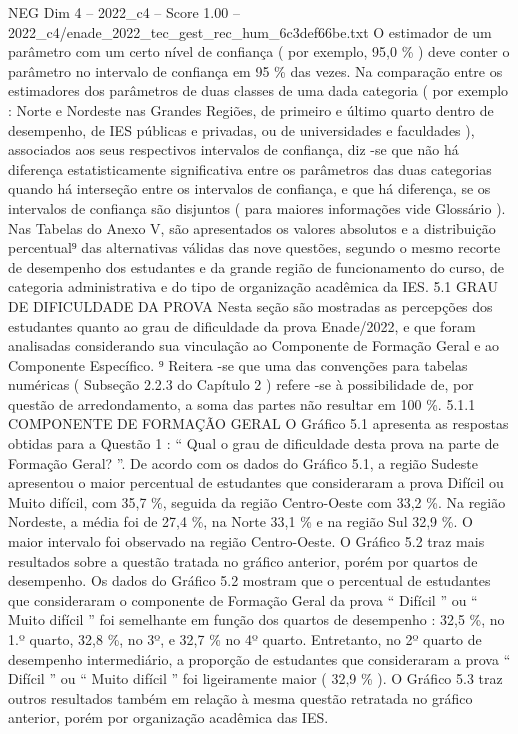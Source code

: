 \begin{textsample}{NEG Dim 4 – 2022\_c4 – Score 1.00 – 2022\_c4/enade\_2022\_tec\_gest\_rec\_hum\_6c3def66be.txt}
O estimador de um parâmetro com um certo nível de confiança ( por exemplo, 95,0 \% ) deve conter o parâmetro no intervalo de confiança em 95 \% das vezes.
Na comparação entre os estimadores dos parâmetros de duas classes de uma dada categoria ( por exemplo : Norte e Nordeste nas Grandes Regiões, de primeiro e último quarto dentro de desempenho, de IES públicas e privadas, ou de universidades e faculdades ), associados aos seus respectivos intervalos de confiança, diz -se que não há diferença estatisticamente significativa entre os parâmetros das duas categorias quando há interseção entre os intervalos de confiança, e que há diferença, se os intervalos de confiança são disjuntos ( para maiores informações vide Glossário ).
Nas Tabelas do Anexo V, são apresentados os valores absolutos e a distribuição percentual⁹ das alternativas válidas das nove questões, segundo o mesmo recorte de desempenho dos estudantes e da grande região de funcionamento do curso, de categoria administrativa e do tipo de organização acadêmica da IES. 5.1 GRAU DE DIFICULDADE DA PROVA Nesta seção são mostradas as percepções dos estudantes quanto ao grau de dificuldade da prova Enade/2022, e que foram analisadas considerando sua vinculação ao Componente de Formação Geral e ao Componente Específico. ⁹ Reitera -se que uma das convenções para tabelas numéricas ( Subseção 2.2.3 do Capítulo 2 ) refere -se à possibilidade de, por questão de arredondamento, a soma das partes não resultar em 100 \%. 5.1.1 COMPONENTE DE FORMAÇÃO GERAL O Gráfico 5.1 apresenta as respostas obtidas para a Questão 1 : “ Qual o grau de dificuldade desta prova na parte de Formação Geral? ”.
De acordo com os dados do Gráfico 5.1, a região Sudeste apresentou o maior percentual de estudantes que consideraram a prova Difícil ou Muito difícil, com 35,7 \%, seguida da região Centro-Oeste com 33,2 \%.
Na região Nordeste, a média foi de 27,4 \%, na Norte 33,1 \% e na região Sul 32,9 \%.
O maior intervalo foi observado na região Centro-Oeste.
O Gráfico 5.2 traz mais resultados sobre a questão tratada no gráfico anterior, porém por quartos de desempenho.
Os dados do Gráfico 5.2 mostram que o percentual de estudantes que consideraram o componente de Formação Geral da prova “ Difícil ” ou “ Muito difícil ” foi semelhante em função dos quartos de desempenho : 32,5 \%, no 1.º quarto, 32,8 \%, no 3º, e 32,7 \% no 4º quarto.
Entretanto, no 2º quarto de desempenho intermediário, a proporção de estudantes que consideraram a prova “ Difícil ” ou “ Muito difícil ” foi ligeiramente maior ( 32,9 \% ).
O Gráfico 5.3 traz outros resultados também em relação à mesma questão retratada no gráfico anterior, porém por organização acadêmica das IES.

\end{textsample}
